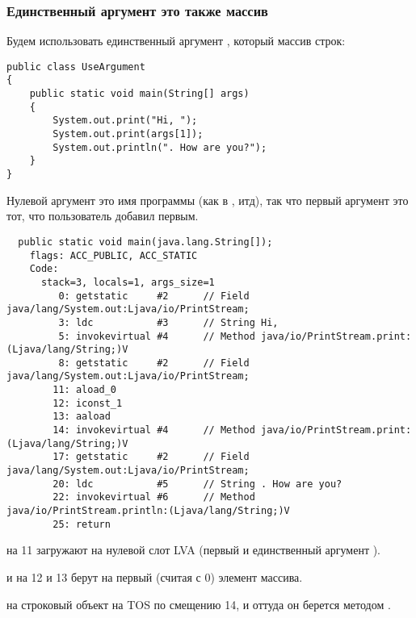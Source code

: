 \subsubsection{Единственный аргумент \main это также массив}


Будем использовать единственный аргумент \main, который массив строк:

\begin{lstlisting}
public class UseArgument
{
	public static void main(String[] args)
	{
		System.out.print("Hi, ");
		System.out.print(args[1]);
		System.out.println(". How are you?");
	}
}
\end{lstlisting}


Нулевой аргумент это имя программы (как в \CCpp, итд),
так что первый аргумент это тот, что пользователь добавил первым.

\begin{lstlisting}
  public static void main(java.lang.String[]);
    flags: ACC_PUBLIC, ACC_STATIC
    Code:
      stack=3, locals=1, args_size=1
         0: getstatic     #2      // Field java/lang/System.out:Ljava/io/PrintStream;
         3: ldc           #3      // String Hi, 
         5: invokevirtual #4      // Method java/io/PrintStream.print:(Ljava/lang/String;)V
         8: getstatic     #2      // Field java/lang/System.out:Ljava/io/PrintStream;
        11: aload_0       
        12: iconst_1      
        13: aaload        
        14: invokevirtual #4      // Method java/io/PrintStream.print:(Ljava/lang/String;)V
        17: getstatic     #2      // Field java/lang/System.out:Ljava/io/PrintStream;
        20: ldc           #5      // String . How are you?
        22: invokevirtual #6      // Method java/io/PrintStream.println:(Ljava/lang/String;)V
        25: return        
\end{lstlisting}


 на 11 загружают  на нулевой слот \ac{LVA} 
(первый и единственный аргумент \main).

 и  на 12 и 13 берут  на первый (считая с 0) 
элемент массива.

 на строковый объект на \ac{TOS} по смещению 14, и оттуда он 
берется методом .
